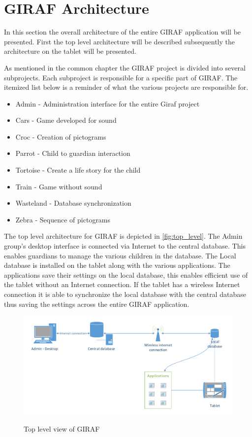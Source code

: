 \section{GIRAF Architecture}
In this section the overall architecture of the entire GIRAF application will be presented. First the top level architecture will be described subsequently the architecture on the tablet will be presented.

As mentioned in the common chapter  the GIRAF project is divided into several subprojects. Each subproject is responsible for a specific part of GIRAF. The itemized list below is a reminder of what the various projects are responsible for.

\begin{itemize}
	\item Admin - Administration interface for the entire Giraf project
	\item Cars - Game developed for sound
	\item Croc - Creation of pictograms
	\item Parrot - Child to guardian interaction
	\item Tortoise - Create a life story for the child
	\item Train - Game without sound
	\item Wasteland - Database synchronization
	\item Zebra - Sequence of pictograms
\end{itemize}

The top level architecture for GIRAF is depicted in \autoref{fig:top_level}. The Admin group's desktop interface is connected via Internet to the central database. This enables guardians to manage the various children in the database. The Local database is installed on the tablet along with the various applications. The applications save their settings on the local database, this enables efficient use of the tablet without an Internet connection. If the tablet has a wireless Internet connection it is able to synchronize the local database with the central database thus saving the settings across the entire GIRAF application. 

\begin{figure}[htpb]
\includegraphics[width=\textwidth]{img/top_level.pdf}
\label{fig:top_level}
\caption{Top level view of GIRAF}
\end{figure}

